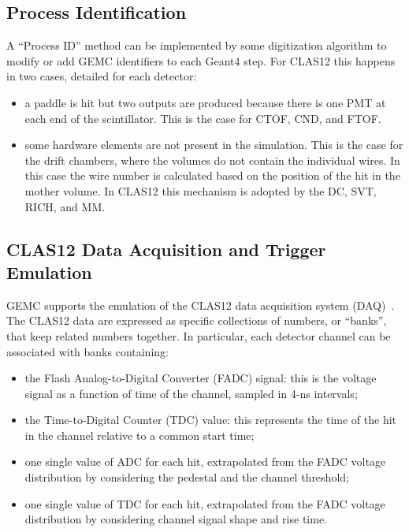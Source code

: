 \subsection{Process Identification}

A ``Process ID'' method can be implemented by some digitization algorithm to modify or add GEMC identifiers to
each Geant4 step. For CLAS12 this happens in two cases, detailed for each detector:

\begin{itemize}
	\item a paddle is hit but two outputs are produced because there is one PMT at each end of the scintillator. This
          is the case for CTOF, CND, and FTOF.
        \item some hardware elements are not present in the simulation. This is the case for the drift chambers, where the
          volumes do not contain the individual wires. In this case the wire number is calculated based on the position of the
          hit in the mother volume. In CLAS12 this mechanism is adopted by the DC, SVT, RICH, and MM.
\end{itemize}

\subsection{CLAS12 Data Acquisition and Trigger Emulation}

GEMC supports the emulation of the CLAS12 data acquisition system (DAQ)~\cite{daq-nim}. The CLAS12 data are
expressed as specific collections of numbers, or ``banks'', that keep related numbers together. In particular, each
detector channel can be associated with banks containing:

\begin{itemize}
    \item the Flash Analog-to-Digital Converter (FADC) signal: this is the voltage signal as a function of time of the channel,
          sampled in 4-ns intervals;
    \item the Time-to-Digital Counter (TDC) value: this represents the time of the hit in the channel relative
          to a common start time;
    \item one single value of ADC for each hit, extrapolated from the FADC voltage distribution by considering the pedestal
          and the channel threshold;
    \item one single value of TDC for each hit, extrapolated from the FADC voltage distribution by considering channel
          signal shape and rise time.
\end{itemize}

